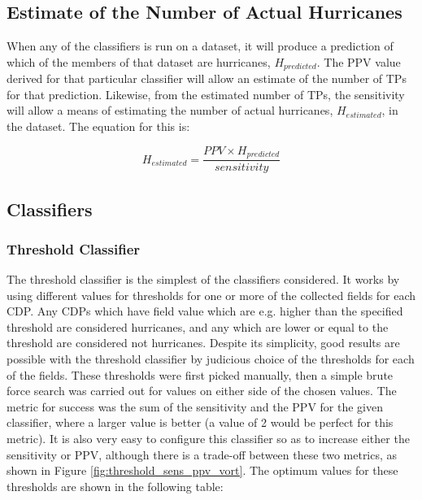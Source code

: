 \documentclass[pdftex,12pt,a4paper]{report}
\begin{document}
\subsection{Estimate of the Number of Actual Hurricanes}
\label{sec:estimated_hurricanes}

When any of the classifiers is run on a dataset, it will produce a prediction of which of the
members of that dataset are hurricanes, $H_{predicted}$. The PPV value derived for that particular classifier will
allow an estimate of the number of TPs for that prediction. Likewise, from the estimated number of
TPs, the sensitivity will allow a means of estimating the number of actual hurricanes, $H_{estimated}$,
in the dataset. The equation for this is:

\begin{equation}
    H_{estimated} = \frac{PPV \times H_{predicted}}{sensitivity}
    \label{eqn:n_actual_hurricane}
\end{equation}

\subsection{Classifiers}

\subsubsection{Threshold Classifier}
The threshold classifier is the simplest of the classifiers considered. It works by using different
values for thresholds for one or more of the collected fields for each CDP. Any CDPs which have
field value which are e.g. higher than the specified threshold are considered hurricanes, and any
which are lower or equal to the threshold are considered not hurricanes. Despite its simplicity,
good results are possible with the threshold classifier by judicious choice of the thresholds for
each of the fields. These thresholds were first picked manually, then a simple brute force search
was carried out for values on either side of the chosen values. The metric for success was the sum
of the sensitivity and the PPV for the given classifier, where a larger value is better (a value of
2 would be perfect for this metric). It is also very easy to configure this classifier so as to
increase either the sensitivity or PPV, although there is a trade-off between these two metrics, as
shown in Figure \ref{fig:threshold_sens_ppv_vort}. The optimum values for these thresholds are shown
in the following table:
\end{document}
